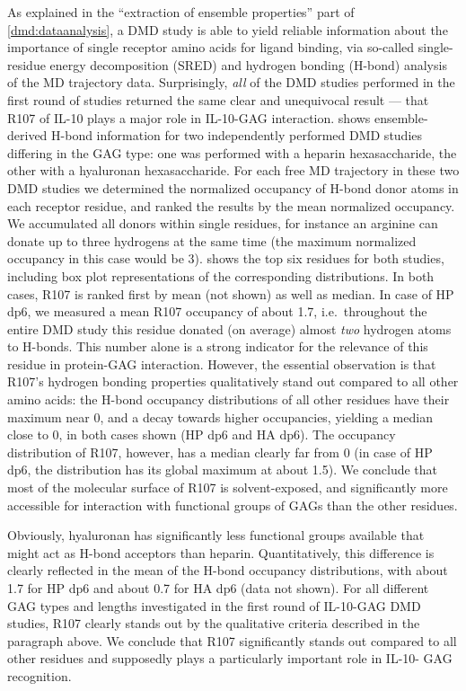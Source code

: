 As explained in the \enquote{extraction of ensemble properties} part of
\cref{dmd:dataanalysis}, a DMD study is able to yield reliable information
about the importance of single receptor amino acids for ligand binding, via
so-called single-residue energy decomposition (SRED) and hydrogen bonding
(H-bond) analysis of the MD trajectory data. Surprisingly, \textit{all} of the
DMD studies performed in the first round of studies returned the same clear and
unequivocal result --- that R107 of IL-10 plays a major role in IL-10-GAG
interaction.  shows ensemble-derived
H-bond information for two independently performed DMD studies differing in the
GAG type: one was performed with a heparin hexasaccharide, the other with a
hyaluronan hexasaccharide. For each free MD trajectory in these two DMD studies
we determined the normalized occupancy of H-bond donor atoms in each receptor
residue, and ranked the results by the mean normalized occupancy. We accumulated
all donors within single residues, for instance an arginine can donate up to
three hydrogens at the same time (the maximum normalized occupancy in this case
would be 3).  shows the top six
residues for both studies, including box plot representations of the
corresponding distributions. In both cases, R107 is ranked first by mean (not
shown) as well as median. In case of HP dp6, we measured a mean R107 occupancy
of about 1.7, i.e.\ throughout the entire DMD study this residue donated (on
average) almost \textit{two} hydrogen atoms to H-bonds. This number alone is a
strong indicator for the relevance of this residue in protein-GAG interaction.
However, the essential observation is that R107's hydrogen bonding properties
qualitatively stand out compared to all other amino acids: the H-bond occupancy
distributions of all other residues have their maximum near 0, and a decay
towards higher occupancies, yielding a median close to 0, in both cases shown
(HP dp6 and HA dp6). The occupancy distribution of R107, however, has a median
clearly far from 0 (in case of HP dp6, the distribution has its global maximum
at about 1.5). We conclude that most of the molecular surface of R107 is
solvent-exposed, and significantly more accessible for interaction with
functional groups of GAGs than the other residues.

Obviously, hyaluronan has significantly less functional groups available that
might act as H-bond acceptors than heparin. Quantitatively, this difference is
clearly reflected in the mean of the H-bond occupancy distributions, with about
1.7 for HP dp6 and about 0.7 for HA dp6 (data not shown). For all different GAG
types and lengths investigated in the first round of IL-10-GAG DMD studies, R107
clearly stands out by the qualitative criteria described in the paragraph above.
We conclude that R107 significantly stands out compared to all other residues
and supposedly plays a particularly important role in IL-10- GAG recognition.


